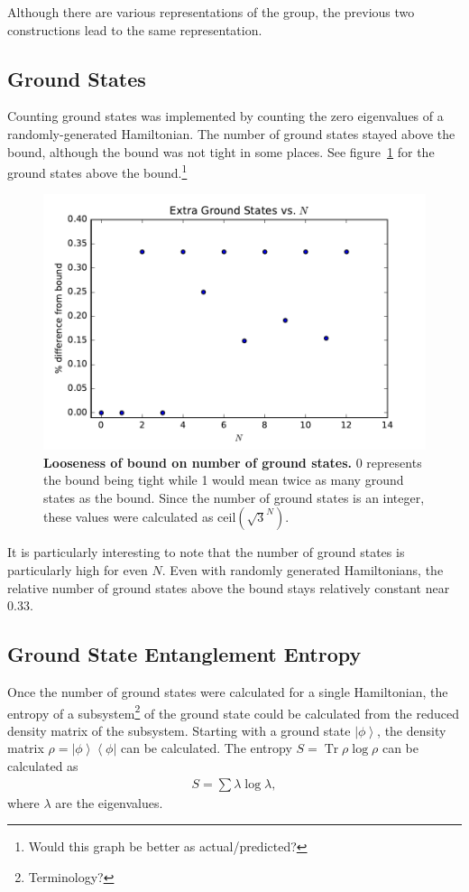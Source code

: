 \documentclass[12pt]{article} %
\newcommand{\ket}[1]{\left|#1\right\rangle}
\newcommand{\bra}[1]{\left\langle#1\right|}
\DeclareMathOperator{\Tr}{Tr}
\begin{document}
Although there are various representations of the group, the previous two constructions lead to the same representation. 

\subsection{Ground States} \emph{}

Counting ground states was implemented by counting the zero eigenvalues of a randomly-generated Hamiltonian. The number of ground states stayed above the bound, although the bound was not tight in some places. See figure~\ref{fig:gserr} for the ground states above the bound.\footnote{Would this graph be better as actual/predicted?}

\begin{figure}
	\centering
	\includegraphics[width=.5\textwidth]{gserr}
	\caption{\textbf{Looseness of bound on number of ground states.} 0 represents the bound being tight while 1 would mean twice as many ground states as the bound. Since the number of ground states is an integer, these values were calculated as $\text{ceil}(\sqrt{3}^N)$.}
	\label{fig:gserr}
\end{figure}

It is particularly interesting to note that the number of ground states is particularly high for even $N$. Even with randomly generated Hamiltonians, the relative number of ground states above the bound stays relatively constant near 0.33. 

\subsection{Ground State Entanglement Entropy}

Once the number of ground states were calculated for a single Hamiltonian, the entropy of a subsystem\footnote{Terminology?} of the ground state could be calculated from the reduced density matrix of the subsystem. Starting with a ground state $\ket{\phi}$, the density matrix $\rho = \ket{\phi}\bra{\phi}$ can be calculated. The entropy $S = \Tr\rho\log\rho$ can be calculated as 
\begin{align}
S = \sum \lambda\log\lambda,
\end{align}
where $\lambda$ are the eigenvalues. 
\end{document}
